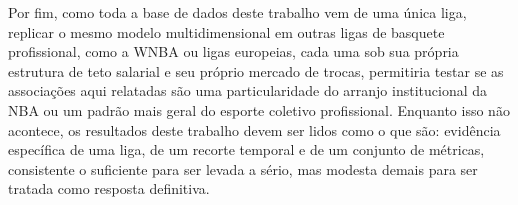 Por fim, como toda a base de dados deste trabalho vem de uma única liga, replicar o mesmo modelo multidimensional em outras ligas de basquete profissional, como a WNBA ou ligas europeias, cada uma sob sua própria estrutura de teto salarial e seu próprio mercado de trocas, permitiria testar se as associações aqui relatadas são uma particularidade do arranjo institucional da NBA ou um padrão mais geral do esporte coletivo profissional. Enquanto isso não acontece, os resultados deste trabalho devem ser lidos como o que são: evidência específica de uma liga, de um recorte temporal e de um conjunto de métricas, consistente o suficiente para ser levada a sério, mas modesta demais para ser tratada como resposta definitiva.
